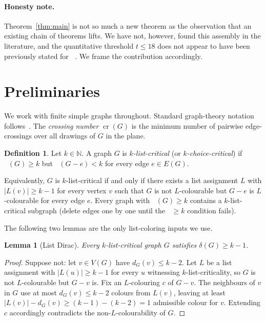 \documentclass[11pt,a4paper]{article}
\newtheorem{lemma}[theorem]{Lemma}
\theoremstyle{definition}
\newtheorem{definition}[theorem]{Definition}
\DeclareMathOperator{\crN}{cr}
\DeclareMathOperator{\chl}{\chi_{\ell}}
\newcommand{\NN}{\mathbb{N}}
\begin{document}
\paragraph{Honesty note.}
Theorem~\ref{thm:main} is not so much a new theorem as the
observation that an existing chain of theorems lifts. We have
not, however, found this assembly in the literature, and the
quantitative threshold $t \le 18$ does not appear to have been
previously stated for $\chl$. We frame the contribution accordingly.

\section{Preliminaries}\label{sec:prelim}

We work with finite simple graphs throughout. Standard graph-theory
notation follows~\cite{Diestel}. The \emph{crossing number}
$\crN(G)$ is the minimum number of pairwise edge-crossings over all
drawings of $G$ in the plane.

\begin{definition}\label{def:list-critical}
Let $k \in \NN$. A graph $G$ is \emph{$k$-list-critical} (or
\emph{$k$-choice-critical}) if $\chl(G) \ge k$ but
$\chl(G - e) < k$ for every edge $e \in E(G)$.
\end{definition}

Equivalently, $G$ is $k$-list-critical if and only if there exists
a list assignment $L$ with $|L(v)| \ge k - 1$ for every vertex $v$
such that $G$ is not $L$-colourable but $G - e$ is $L$-colourable
for every edge $e$. Every graph with $\chl(G) \ge k$ contains a
$k$-list-critical subgraph (delete edges one by one until the
$\chl \ge k$ condition fails).

The following two lemmas are the only list-coloring inputs we use.

\begin{lemma}[List Dirac]\label{lem:list-dirac}
Every $k$-list-critical graph $G$ satisfies $\delta(G) \ge k - 1$.
\end{lemma}

\begin{proof}
Suppose not: let $v \in V(G)$ have $d_G(v) \le k - 2$. Let $L$ be a
list assignment with $|L(u)| \ge k - 1$ for every $u$ witnessing
$k$-list-criticality, so $G$ is not $L$-colourable but $G - v$ is.
Fix an $L$-colouring $c$ of $G - v$. The neighbours of $v$ in $G$
use at most $d_G(v) \le k - 2$ colours from $L(v)$, leaving at least
$|L(v)| - d_G(v) \ge (k - 1) - (k - 2) = 1$ admissible colour for
$v$. Extending $c$ accordingly contradicts the non-$L$-colourability
of $G$.
\end{proof}
\end{document}
